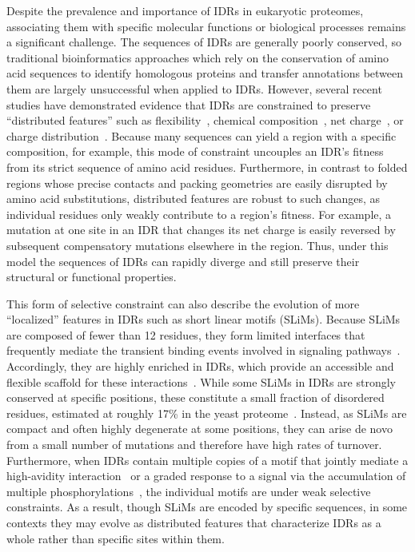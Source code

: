 Despite the prevalence and importance of IDRs in eukaryotic proteomes, associating them with specific molecular functions or biological processes remains a significant challenge. The sequences of IDRs are generally poorly conserved, so traditional bioinformatics approaches which rely on the conservation of amino acid sequences to identify homologous proteins and transfer annotations between them are largely unsuccessful when applied to IDRs. However, several recent studies have demonstrated evidence that IDRs are constrained to preserve ``distributed features'' such as flexibility~\cite{Daughdrill2007}, chemical composition~\cite{Moesa2012}, net charge~\cite{Zarin2017}, or charge distribution~\cite{Beh2012}. Because many sequences can yield a region with a specific composition, for example, this mode of constraint uncouples an IDR's fitness from its strict sequence of amino acid residues. Furthermore, in contrast to folded regions whose precise contacts and packing geometries are easily disrupted by amino acid substitutions, distributed features are robust to such changes, as individual residues only weakly contribute to a region's fitness. For example, a mutation at one site in an IDR that changes its net charge is easily reversed by subsequent compensatory mutations elsewhere in the region. Thus, under this model the sequences of IDRs can rapidly diverge and still preserve their structural or functional properties.

This form of selective constraint can also describe the evolution of more ``localized'' features in IDRs such as short linear motifs (SLiMs). Because SLiMs are composed of fewer than 12 residues, they form limited interfaces that frequently mediate the transient binding events involved in signaling pathways~\cite{Tompa2014}. Accordingly, they are highly enriched in IDRs, which provide an accessible and flexible scaffold for these interactions~\cite{Fuxreiter2007, Davey2012}. While some SLiMs in IDRs are strongly conserved at specific positions, these constitute a small fraction of disordered residues, estimated at roughly 17\% in the yeast proteome~\cite{NguyenBa2012}. Instead, as SLiMs are compact and often highly degenerate at some positions, they can arise de novo from a small number of mutations and therefore have high rates of turnover. Furthermore, when IDRs contain multiple copies of a motif that jointly mediate a high-avidity interaction~\cite{Tompa2014} or a graded response to a signal via the accumulation of multiple phosphorylations~\cite{Wright2014}, the individual motifs are under weak selective constraints. As a result, though SLiMs are encoded by specific sequences, in some contexts they may evolve as distributed features that characterize IDRs as a whole rather than specific sites within them.

